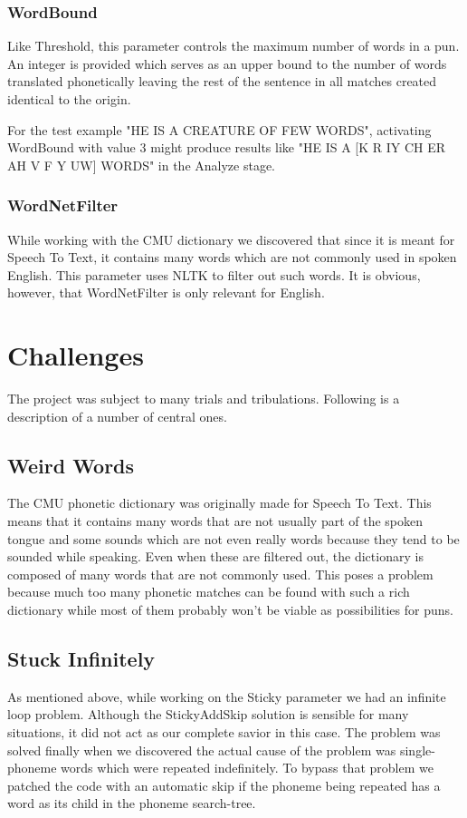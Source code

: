 \documentclass[11pt,a4paper]{article}
\begin{document}
\subsubsection{WordBound}
Like Threshold, this parameter controls the maximum number of words in a pun. An integer is provided which serves as an upper bound to the number of words translated phonetically leaving the rest of the sentence in all matches created identical to the origin.

For the test example "HE IS A CREATURE OF FEW WORDS", activating WordBound with value 3 might produce results like "HE IS A [K R IY CH ER AH V F Y UW] WORDS" in the Analyze stage.

\subsubsection{WordNetFilter}
While working with the CMU dictionary we discovered that since it is meant for Speech To Text, it contains many words which are not commonly used in spoken English. This parameter uses NLTK to filter out such words. It is obvious, however, that WordNetFilter is only relevant for English.

\section{Challenges}

The project was subject to many trials and tribulations. Following is a description of a number of central ones. 

\subsection{Weird Words}
The CMU phonetic dictionary was originally made for Speech To Text. This means that it contains many words that are not usually part of the spoken tongue and some sounds which are not even really words because they tend to be sounded while speaking. Even when these are filtered out, the dictionary is composed of many words that are not commonly used. This poses a problem because much too many phonetic matches can be found with such a rich dictionary while most of them probably won't be viable as possibilities for puns.

\subsection{Stuck Infinitely}
As mentioned above, while working on the Sticky parameter we had an infinite loop problem. Although the StickyAddSkip solution is sensible for many situations, it did not act as our complete savior in this case. The problem was solved finally when we discovered the actual cause of the problem was single-phoneme words which were repeated indefinitely. To bypass that problem we patched the code with an automatic skip if the phoneme being repeated has a word as its child in the phoneme search-tree.
\end{document}
